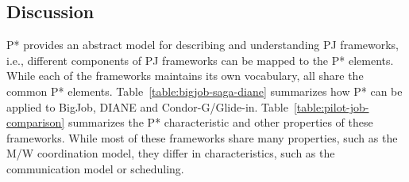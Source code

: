 \documentclass[conference]{IEEEtran}
\begin{document}
\subsection{Discussion}

P* provides an abstract model for describing and understanding PJ
frameworks, i.e., different components of PJ frameworks can be mapped
to the P* elements.  While each of the frameworks maintains its own
vocabulary, all share the common P* elements.
Table~\ref{table:bigjob-saga-diane} summarizes how P* can be applied
to BigJob, DIANE and Condor-G/Glide-in.
Table~\ref{table:pilot-job-comparison} summarizes the P*
characteristic and other properties of these frameworks. While most of
these frameworks share many properties, such as the M/W coordination
model, they differ in characteristics, such as the communication model
or scheduling. 










% 
\end{document}
